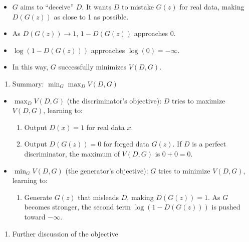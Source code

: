 \begin{itemize}
\begin{itemize}
    \begin{itemize}
    \tightlist
    \item
      \(G\) aims to ``deceive'' \(D\). It wants \(D\) to mistake \(G(z)\) for real data, making \(D(G(z))\) as close to 1 as possible.
    \item
      As \(D(G(z))\to 1\), \(1-D(G(z))\) approaches 0.
    \item
      \(\log(1-D(G(z)))\) approaches \(\log(0)=-\infty\).
    \item
      In this way, \(G\) successfully minimizes \(V(D,G)\).
    \end{itemize}
  \end{itemize}
\end{itemize}

\begin{enumerate}
\def\labelenumi{\arabic{enumi}.}
\setcounter{enumi}{3}
\tightlist
\item
  Summary: \(\min_G \max_D V(D,G)\)
\end{enumerate}

\begin{itemize}
\tightlist
\item
{}
  \(\max_D V(D,G)\) (the discriminator's objective): \(D\) tries to maximize \(V(D,G)\), learning to:

  \begin{enumerate}
  \def\labelenumi{\arabic{enumi}.}
  \tightlist
  \item
    Output \(D(x)=1\) for real data \(x\).
  \item
    Output \(D(G(z))=0\) for forged data \(G(z)\). If \(D\) is a perfect discriminator, the maximum of \(V(D,G)\) is \(0+0=0\).
  \end{enumerate}
\item
{}
  \(\min_G V(D,G)\) (the generator's objective): \(G\) tries to minimize \(V(D,G)\), learning to:

  \begin{enumerate}
  \def\labelenumi{\arabic{enumi}.}
  \tightlist
  \item
    Generate \(G(z)\) that misleads \(D\), making \(D(G(z))=1\). As \(G\) becomes stronger, the second term \(\log(1-D(G(z)))\) is pushed toward \(-\infty\).
  \end{enumerate}
\end{itemize}

\begin{enumerate}
\def\labelenumi{\arabic{enumi}.}
\setcounter{enumi}{4}
\tightlist
\item
  Further discussion of the objective
\end{enumerate}


